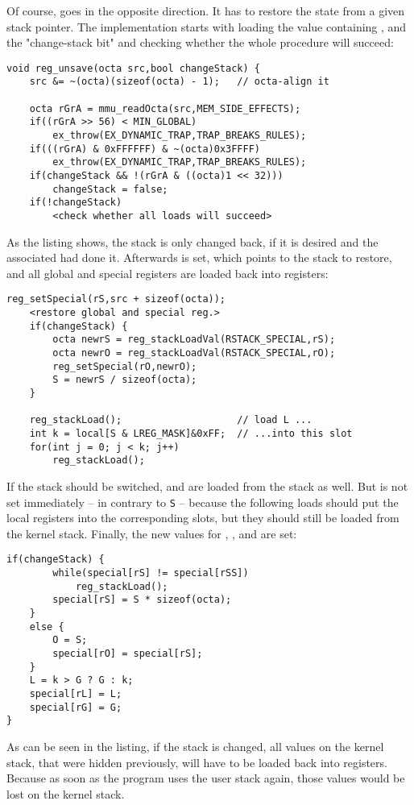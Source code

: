 Of course,  goes in the opposite direction. It has to restore the state from a given stack pointer. The implementation starts with loading the value containing ,  and the "change-stack bit" and checking whether the whole procedure will succeed:
\begin{lstlisting}[language=GIMMIXC,caption={Implementation of {\tt reg\_unsave}, part 1 (partially pseudo-code)}]
void reg_unsave(octa src,bool changeStack) {
	src &= ~(octa)(sizeof(octa) - 1);	// octa-align it

	octa rGrA = mmu_readOcta(src,MEM_SIDE_EFFECTS);
	if((rGrA >> 56) < MIN_GLOBAL)
		ex_throw(EX_DYNAMIC_TRAP,TRAP_BREAKS_RULES);
	if(((rGrA) & 0xFFFFFF) & ~(octa)0x3FFFF)
		ex_throw(EX_DYNAMIC_TRAP,TRAP_BREAKS_RULES);
	if(changeStack && !(rGrA & ((octa)1 << 32)))
		changeStack = false;
	if(!changeStack)
		<check whether all loads will succeed>
\end{lstlisting}
As the listing shows, the stack is only changed back, if it is desired and the associated  had done it. Afterwards  is set, which points to the stack to restore, and all global and special registers are loaded back into registers:
\begin{lstlisting}[language=GIMMIXC,caption={Implementation of {\tt reg\_unsave}, part 2 (partially pseudo-code)}]
	reg_setSpecial(rS,src + sizeof(octa));
	<restore global and special reg.>
	if(changeStack) {
		octa newrS = reg_stackLoadVal(RSTACK_SPECIAL,rS);
		octa newrO = reg_stackLoadVal(RSTACK_SPECIAL,rO);
		reg_setSpecial(rO,newrO);
		S = newrS / sizeof(octa);
	}

	reg_stackLoad();					// load L ...
	int k = local[S & LREG_MASK]&0xFF;	// ...into this slot
	for(int j = 0; j < k; j++)
		reg_stackLoad();
\end{lstlisting}
If the stack should be switched,  and  are loaded from the stack as well. But  is not set immediately -- in contrary to {\tt S} -- because the following loads should put the local registers into the corresponding slots, but they should still be loaded from the kernel stack. Finally, the new values for , ,  and  are set:
\begin{lstlisting}[language=GIMMIXC,caption={Implementation of {\tt reg\_unsave}, part 3}]
	if(changeStack) {
		while(special[rS] != special[rSS])
			reg_stackLoad();
		special[rS] = S * sizeof(octa);
	}
	else {
		O = S;
		special[rO] = special[rS];
	}
	L = k > G ? G : k;
	special[rL] = L;
	special[rG] = G;
}
\end{lstlisting}
As can be seen in the listing, if the stack is changed, all values on the kernel stack, that were hidden previously, will have to be loaded back into registers. Because as soon as the program uses the user stack again, those values would be lost on the kernel stack.


